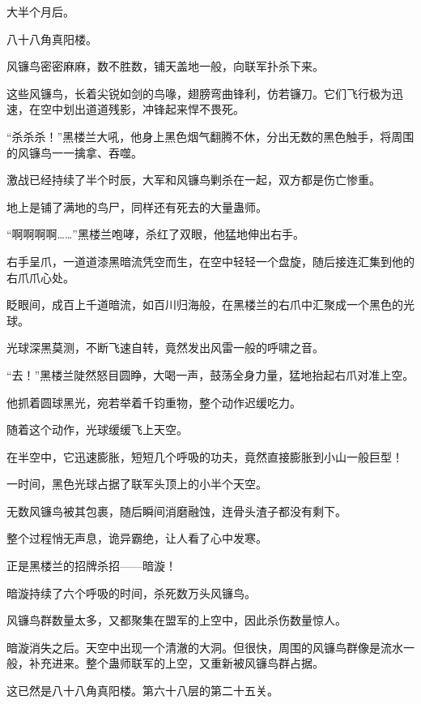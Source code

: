 
\begin{this_body}



大半个月后。

八十八角真阳楼。

风镰鸟密密麻麻，数不胜数，铺天盖地一般，向联军扑杀下来。

这些风镰鸟，长着尖锐如剑的鸟喙，翅膀弯曲锋利，仿若镰刀。它们飞行极为迅速，在空中划出道道残影，冲锋起来悍不畏死。

“杀杀杀！”黑楼兰大吼，他身上黑色烟气翻腾不休，分出无数的黑色触手，将周围的风镰鸟一一擒拿、吞噬。

激战已经持续了半个时辰，大军和风镰鸟剿杀在一起，双方都是伤亡惨重。

地上是铺了满地的鸟尸，同样还有死去的大量蛊师。

“啊啊啊啊……”黑楼兰咆哮，杀红了双眼，他猛地伸出右手。

右手呈爪，一道道漆黑暗流凭空而生，在空中轻轻一个盘旋，随后接连汇集到他的右爪爪心处。

眨眼间，成百上千道暗流，如百川归海般，在黑楼兰的右爪中汇聚成一个黑色的光球。

光球深黑莫测，不断飞速自转，竟然发出风雷一般的呼啸之音。

“去！”黑楼兰陡然怒目圆睁，大喝一声，鼓荡全身力量，猛地抬起右爪对准上空。

他抓着圆球黑光，宛若举着千钧重物，整个动作迟缓吃力。

随着这个动作，光球缓缓飞上天空。

在半空中，它迅速膨胀，短短几个呼吸的功夫，竟然直接膨胀到小山一般巨型！

一时间，黑色光球占据了联军头顶上的小半个天空。

无数风镰鸟被其包裹，随后瞬间消磨融蚀，连骨头渣子都没有剩下。

整个过程悄无声息，诡异霸绝，让人看了心中发寒。

正是黑楼兰的招牌杀招——暗漩！

暗漩持续了六个呼吸的时间，杀死数万头风镰鸟。

风镰鸟群数量太多，又都聚集在盟军的上空中，因此杀伤数量惊人。

暗漩消失之后。天空中出现一个清澈的大洞。但很快，周围的风镰鸟群像是流水一般，补充进来。整个蛊师联军的上空，又重新被风镰鸟群占据。

这已然是八十八角真阳楼。第六十八层的第二十五关。


\end{this_body}

